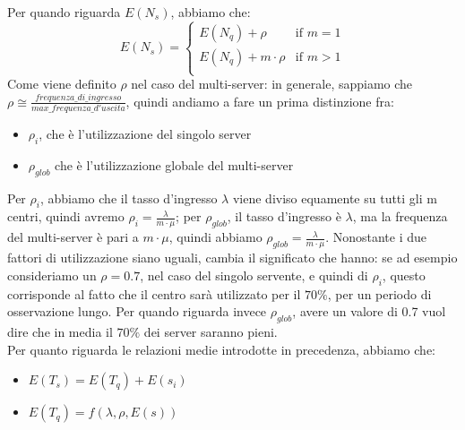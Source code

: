 \documentclass{article}
\begin{document}
Per quando riguarda $E(N_s)$, abbiamo che:
\[
E(N_s) =
\begin{cases}
E(N_q) + \rho & \text{if } m = 1\\
E(N_q) + m\cdot \rho & \text{if } m > 1\\
\end{cases}
\]
Come viene definito $\rho$ nel caso del multi-server: in generale, sappiamo che $\rho \cong \frac{frequenza\_di\_ingresso}{max\_frequenza\_d'uscita}$, quindi andiamo a fare un prima distinzione fra:
\begin{itemize}
\item $\rho_i$, che è l'utilizzazione del singolo server
\item $\rho_{glob}$ che è l'utilizzazione globale del multi-server
\end{itemize}
Per $\rho_i$, abbiamo che il tasso d'ingresso $\lambda$ viene diviso equamente su tutti gli m centri, quindi avremo $\rho_i = \frac{\lambda}{m\cdot \mu}$; per $\rho_{glob}$, il tasso d'ingresso è $\lambda$, ma la frequenza del multi-server è pari a $m\cdot \mu$, quindi abbiamo $\rho_{glob} = \frac{\lambda}{m\cdot \mu}$. Nonostante i due fattori di utilizzazione siano uguali, cambia il significato che hanno: se ad esempio consideriamo un $\rho = 0.7$, nel caso del singolo servente, e quindi di $\rho_i$, questo corrisponde al fatto che il centro sarà utilizzato per il $70\%$, per un periodo di osservazione lungo. Per quando riguarda invece $\rho_{glob}$, avere un valore di 0.7 vuol dire che in media il $70\%$ dei server saranno pieni.\\ Per quanto riguarda le relazioni medie introdotte in precedenza, abbiamo che:
\begin{itemize}
\item $E(T_s) = E(T_q) + E(s_i)$
\item $E(T_q) = f(\lambda, \rho, E(s))$
\end{itemize}
\end{document}
